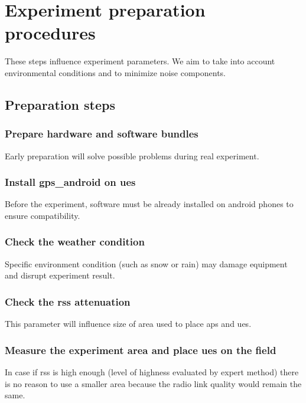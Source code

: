 \section{Experiment preparation procedures}\label{experiment-preparation-procedures}

These steps influence experiment parameters. We aim to take into account
environmental conditions and to minimize noise components.


\subsection{Preparation steps}\label{steps}

\subsubsection{Prepare hardware and software bundles}

Early preparation will solve possible problems during real experiment.

\subsubsection{Install \gls{gps_android} on \glspl{ue}}

Before the experiment, software must be already installed on \gls{android} phones to ensure compatibility.

\subsubsection{Check the weather condition}

Specific environment condition (such as snow or rain) may damage equipment
and disrupt experiment result.

\subsubsection{Check the \acrshort{rss} attenuation}

This parameter will influence size of area used to place \glspl{ap} and \glspl{ue}.


\subsubsection{Measure the experiment area and place \glspl{ue} on the field}

In case if \acrshort{rss} is high enough (level of highness evaluated by expert method) there is no reason to use a smaller area
because the radio link quality would remain the same.